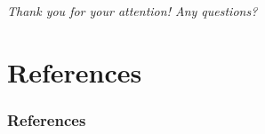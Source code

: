 \documentclass{beamer}
\begin{document}
\begin{frame}{}
	\centering \Large
	\emph{Thank you for your attention! Any questions?}
\end{frame}

\section{References}



\begin{frame}[allowframebreaks]
	\frametitle{References}
	
	
\end{frame}

	
\end{document}
